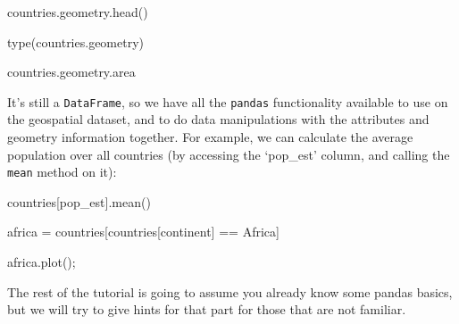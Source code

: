 \documentclass[
  letterpaper,
  DIV=11,
  numbers=noendperiod]{scrreprt}
\newenvironment{Shaded}{\begin{snugshade}}{\end{snugshade}}
\newcommand{\BuiltInTok}[1]{\textcolor[rgb]{0.00,0.23,0.31}{#1}}
\newcommand{\NormalTok}[1]{\textcolor[rgb]{0.00,0.23,0.31}{#1}}
\newcommand{\OperatorTok}[1]{\textcolor[rgb]{0.37,0.37,0.37}{#1}}
\newcommand{\StringTok}[1]{\textcolor[rgb]{0.13,0.47,0.30}{#1}}
\begin{document}
\begin{Shaded}
\begin{Highlighting}[]
\NormalTok{countries.geometry.head()}
\end{Highlighting}
\end{Shaded}

\begin{Shaded}
\begin{Highlighting}[]
\BuiltInTok{type}\NormalTok{(countries.geometry)}
\end{Highlighting}
\end{Shaded}

\begin{Shaded}
\begin{Highlighting}[]
\NormalTok{countries.geometry.area}
\end{Highlighting}
\end{Shaded}

It's still a \texttt{DataFrame}, so we have all the \texttt{pandas}
functionality available to use on the geospatial dataset, and to do data
manipulations with the attributes and geometry information together. For
example, we can calculate the average population over all countries (by
accessing the `pop\_est' column, and calling the \texttt{mean} method on
it):

\begin{Shaded}
\begin{Highlighting}[]
\NormalTok{countries[}\StringTok{\textquotesingle{}pop\_est\textquotesingle{}}\NormalTok{].mean()}
\end{Highlighting}
\end{Shaded}

\begin{Shaded}
\begin{Highlighting}[]
\NormalTok{africa }\OperatorTok{=}\NormalTok{ countries[countries[}\StringTok{\textquotesingle{}continent\textquotesingle{}}\NormalTok{] }\OperatorTok{==} \StringTok{\textquotesingle{}Africa\textquotesingle{}}\NormalTok{]}
\end{Highlighting}
\end{Shaded}

\begin{Shaded}
\begin{Highlighting}[]
\NormalTok{africa.plot()}\OperatorTok{;}
\end{Highlighting}
\end{Shaded}

The rest of the tutorial is going to assume you already know some pandas
basics, but we will try to give hints for that part for those that are
not familiar.
\end{document}

